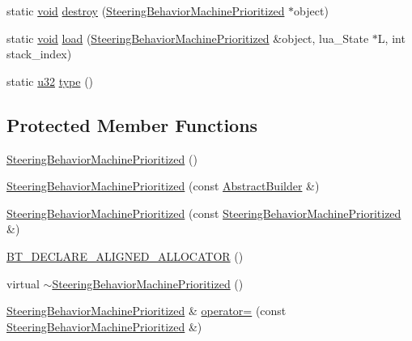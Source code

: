 \begin{DoxyCompactItemize}
\item 
static \mbox{\hyperlink{_thread_8h_af1e856da2e658414cb2456cb6f7ebc66}{void}} \mbox{\hyperlink{classnjli_1_1_steering_behavior_machine_prioritized_a45cfd44a2c65038473e7ac18a4971585}{destroy}} (\mbox{\hyperlink{classnjli_1_1_steering_behavior_machine_prioritized}{Steering\+Behavior\+Machine\+Prioritized}} $\ast$object)
\item 
static \mbox{\hyperlink{_thread_8h_af1e856da2e658414cb2456cb6f7ebc66}{void}} \mbox{\hyperlink{classnjli_1_1_steering_behavior_machine_prioritized_a0c4e4d6d59c41b7869041ccc973c3aca}{load}} (\mbox{\hyperlink{classnjli_1_1_steering_behavior_machine_prioritized}{Steering\+Behavior\+Machine\+Prioritized}} \&object, lua\+\_\+\+State $\ast$L, int stack\+\_\+index)
\item 
static \mbox{\hyperlink{_util_8h_a10e94b422ef0c20dcdec20d31a1f5049}{u32}} \mbox{\hyperlink{classnjli_1_1_steering_behavior_machine_prioritized_a3ca6a1a70276d06bb904a80bfae2110e}{type}} ()
\end{DoxyCompactItemize}
\subsection*{Protected Member Functions}
\begin{DoxyCompactItemize}
\item 
\mbox{\hyperlink{classnjli_1_1_steering_behavior_machine_prioritized_aa3fcf9e42273167b43484a37544a2f38}{Steering\+Behavior\+Machine\+Prioritized}} ()
\item 
\mbox{\hyperlink{classnjli_1_1_steering_behavior_machine_prioritized_a23c42d4f9fbcffe31c1be3a9a03c827d}{Steering\+Behavior\+Machine\+Prioritized}} (const \mbox{\hyperlink{classnjli_1_1_abstract_builder}{Abstract\+Builder}} \&)
\item 
\mbox{\hyperlink{classnjli_1_1_steering_behavior_machine_prioritized_abc12f2ca02c5f5e10da3532541492589}{Steering\+Behavior\+Machine\+Prioritized}} (const \mbox{\hyperlink{classnjli_1_1_steering_behavior_machine_prioritized}{Steering\+Behavior\+Machine\+Prioritized}} \&)
\item 
\mbox{\hyperlink{classnjli_1_1_steering_behavior_machine_prioritized_ab9a73097dc6fbabab96552a89e2f92be}{B\+T\+\_\+\+D\+E\+C\+L\+A\+R\+E\+\_\+\+A\+L\+I\+G\+N\+E\+D\+\_\+\+A\+L\+L\+O\+C\+A\+T\+OR}} ()
\item 
virtual \mbox{\hyperlink{classnjli_1_1_steering_behavior_machine_prioritized_a1c099f3b2fcf92ddc92c6aa1898af538}{$\sim$\+Steering\+Behavior\+Machine\+Prioritized}} ()
\item 
\mbox{\hyperlink{classnjli_1_1_steering_behavior_machine_prioritized}{Steering\+Behavior\+Machine\+Prioritized}} \& \mbox{\hyperlink{classnjli_1_1_steering_behavior_machine_prioritized_ae26142263f740261904ec19c71ca2f19}{operator=}} (const \mbox{\hyperlink{classnjli_1_1_steering_behavior_machine_prioritized}{Steering\+Behavior\+Machine\+Prioritized}} \&)
\end{DoxyCompactItemize}

